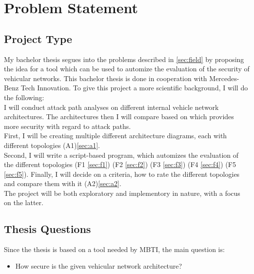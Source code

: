 
\chapter{Problem Statement}
\label{sec:problem}

\section{Project Type}\label{sec:type}

My bachelor thesis segues into the problems described in \ref{sec:field} by proposing the idea for a tool which can be used to automize the evaluation of the security of vehicular networks.
This bachelor thesis is done in cooperation with Mercedes-Benz Tech Innovation.
To give this project a more scientific background, I will do the following: \\

I will conduct attack path analyses on different internal vehicle network architectures.
The architectures then I will compare based on which provides more security with regard to attack paths.\\

First, I will be creating multiple different architecture diagrams, each with different topologies (A1)\ref{sec:a1}.\\
Second, I will write a script-based program, which automizes the evaluation of the different topologies 
(F1 \ref{sec:f1})
(F2 \ref{sec:f2})
(F3 \ref{sec:f3})
(F4 \ref{sec:f4})
(F5 \ref{sec:f5}).
Finally, I will decide on a criteria, how to rate the different topologies and compare them with it (A2)\ref{sec:a2}.\\

The project will be both exploratory and implementory in nature, with a focus on the latter.


\section{Thesis Questions}\label{sec:thesis-questions}

Since the thesis is based on a tool needed by MBTI, the main question is:\\

\begin{itemize}
    \item How secure is the given vehicular network architecture?
\end{itemize}

